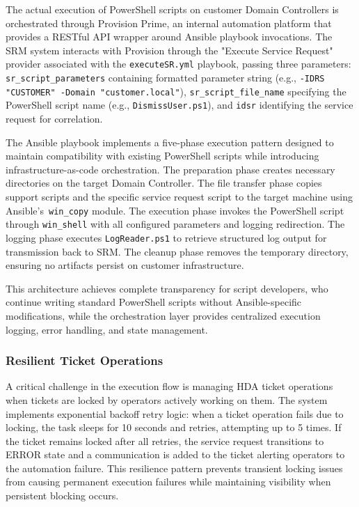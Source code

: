 The actual execution of PowerShell scripts on customer Domain Controllers is orchestrated through Provision Prime, an internal automation platform that provides a RESTful API wrapper around Ansible playbook invocations. The SRM system interacts with Provision through the "Execute Service Request" provider associated with the \texttt{executeSR.yml} playbook, passing three parameters: \texttt{sr\_script\_parameters} containing formatted parameter string (e.g., \texttt{-IDRS "CUSTOMER" -Domain "customer.local"}), \texttt{sr\_script\_file\_name} specifying the PowerShell script name (e.g., \texttt{DismissUser.ps1}), and \texttt{idsr} identifying the service request for correlation.

The Ansible playbook implements a five-phase execution pattern designed to maintain compatibility with existing PowerShell scripts while introducing infrastructure-as-code orchestration. The preparation phase creates necessary directories on the target Domain Controller. The file transfer phase copies support scripts and the specific service request script to the target machine using Ansible's~\texttt{win\_copy} module. The execution phase invokes the PowerShell script through \texttt{win\_shell} with all configured parameters and logging redirection. The logging phase executes \texttt{LogReader.ps1} to retrieve structured log output for transmission back to SRM. The cleanup phase removes the temporary directory, ensuring no artifacts persist on customer infrastructure.

This architecture achieves complete transparency for script developers, who continue writing standard PowerShell scripts without Ansible-specific modifications, while the orchestration layer provides centralized execution logging, error handling, and state management.

\subsubsection{Resilient Ticket Operations}

A critical challenge in the execution flow is managing HDA ticket operations when tickets are locked by operators actively working on them. The system implements exponential backoff retry logic: when a ticket operation fails due to locking, the task sleeps for 10 seconds and retries, attempting up to 5 times. If the ticket remains locked after all retries, the service request transitions to ERROR state and a communication is added to the ticket alerting operators to the automation failure. This resilience pattern prevents transient locking issues from causing permanent execution failures while maintaining visibility when persistent blocking occurs.


